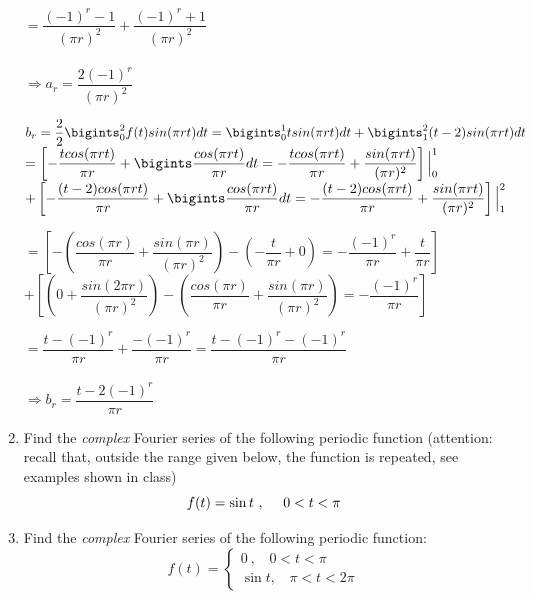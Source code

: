 \documentclass[fleqn]{article}
\begin{document}
\begin{enumerate}
      \bigbreak

      \textcolor{hwColor}{
        $=\dfrac{(-1)^r-1}{(\pi r)^2}+\dfrac{(-1)^r+1}{(\pi r)^2}$ \\
        \\
        $\Longrightarrow a_r=\dfrac{2(-1)^r}{(\pi r)^2}$
      }

      \bigbreak

      \textcolor{hwColor}{
        $b_r=\dfrac{2}{2}\bigints_{0}^{2}f(t) sin(\pi rt)dt=\bigints_{0}^{1}t sin(\pi rt)dt+\bigints_{1}^{2}(t-2) sin(\pi rt)dt$ \\
        $=\left[-\dfrac{tcos(\pi rt)}{\pi r}+\bigints\dfrac{cos(\pi rt)}{\pi r}dt=-\dfrac{t cos(\pi rt)}{\pi r}+\dfrac{sin(\pi rt)}{(\pi r)^2}\right]\Big|_{0}^{1}$ \\
        $+\left[-\dfrac{(t-2)cos(\pi rt)}{\pi r}+\bigints\dfrac{cos(\pi rt)}{\pi r}dt=-\dfrac{(t-2)cos(\pi rt)}{\pi r}+\dfrac{sin(\pi rt)}{(\pi r)^2}\right]\Big|_{1}^{2}$
      }

      \bigbreak

      \textcolor{hwColor}{
        $=\left[-(\dfrac{cos(\pi r)}{\pi r}+\dfrac{sin(\pi r)}{(\pi r)^2})-(-\dfrac{t}{\pi r}+0)=-\dfrac{(-1)^r}{\pi r}+\dfrac{t}{\pi r}\right]$ \\
        $+\left[(0+\dfrac{sin(2\pi r)}{(\pi r)^2})-(\dfrac{cos(\pi r)}{\pi r}+\dfrac{sin(\pi r)}{(\pi r)^2})=-\dfrac{(-1)^r}{\pi r}\right]$
      }

      \bigbreak

      \textcolor{hwColor}{
        $=\dfrac{t-(-1)^r}{\pi r}+\dfrac{-(-1)^r}{\pi r}=\dfrac{t-(-1)^r-(-1)^r}{\pi r}$ \\
        \\
        $\Longrightarrow b_r=\dfrac{t-2(-1)^r}{\pi r}$
      }


    \item Find the \emph{complex} Fourier series of the following periodic function (attention: recall that, outside the range given below, the function is repeated, see examples shown in class)
      \begin{equation}
      f(t)=\sin t~, ~~~~0< t < \pi \\
      \end{equation}

    \item Find the \emph{complex} Fourier series of the following periodic function: 
    \begin{equation}
      f(t)=\begin{cases}
      0~, ~~~~0< t < \pi \\
      \sin t, ~~~~\pi< t< 2 \pi
      \end{cases}
    \end{equation}


  \end{enumerate}
\end{document}
